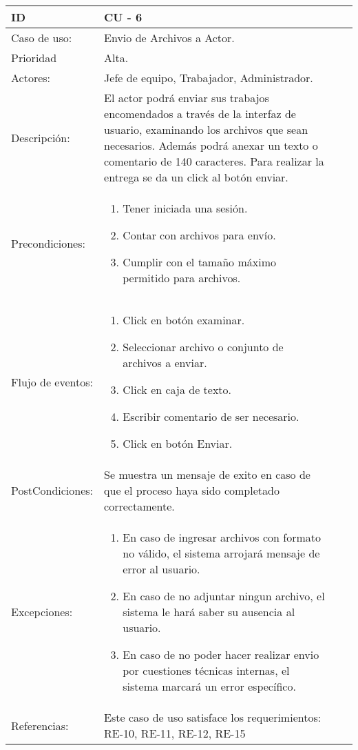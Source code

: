 \documentclass[11pt,a4paper]{article}
\begin{document}
\begin{tabular}[c]{|p{3cm}|p{13cm}|p{2.5cm}|p{3cm}|}
\hline 
\rule[-1ex]{0pt}{2.5ex} ID & CU - 6 \\ 
\hline 
\rule[-1ex]{0pt}{2.5ex} Caso de uso: & Envio de Archivos a Actor.\\ 
\hline 
\rule[-1ex]{0pt}{2.5ex} Prioridad & Alta. \\ 
\hline 
\rule[-1ex]{0pt}{2.5ex} Actores: & Jefe de equipo, Trabajador, Administrador.\\ 
\hline 
\rule[-1ex]{0pt}{2.5ex} Descripción: & El actor podrá enviar sus trabajos encomendados a través de la interfaz de usuario, examinando los archivos que sean necesarios. Además podrá anexar un texto o comentario de 140 caracteres. 
 Para realizar la entrega se da un click al botón enviar.\\ 
\hline 
\rule[-1ex]{0pt}{2.5ex}Precondiciones: & \begin{enumerate}
\item Tener iniciada una sesión.
\item Contar con archivos para envío.
\item Cumplir con el tamaño máximo permitido para archivos.
\end{enumerate} \\ 
\hline 
\rule[-1ex]{0pt}{2.5ex} Flujo de eventos: & \begin{enumerate} 
\item Click en botón examinar.
\item Seleccionar archivo o conjunto de archivos a enviar.
\item Click en caja de texto.
\item Escribir comentario de ser necesario.
\item Click en botón Enviar.
\end{enumerate}
\\ 
\hline 
\rule[-1ex]{0pt}{2.5ex} PostCondiciones: & Se muestra un mensaje 
 de exito en caso de que el proceso haya sido completado correctamente.\\ 
\hline 
\rule[-1ex]{0pt}{2.5ex} Excepciones: & \begin{enumerate} 
\item En caso de ingresar archivos con formato no válido, el sistema arrojará mensaje de error al usuario.
\item En caso de no adjuntar ningun archivo, el sistema le hará saber su ausencia al usuario.
\item En caso de no poder hacer realizar envio por cuestiones técnicas internas, el sistema marcará un error específico.
\end{enumerate} \\ 
\hline 
\rule[-1ex]{0pt}{2.5ex} Referencias: & Este caso de uso satisface los requerimientos: RE-10, RE-11, RE-12, RE-15\\
\hline 
\end{tabular} 
\end{document}
